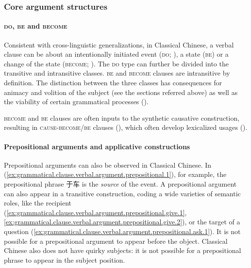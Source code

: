 \documentclass[UTF8, a4paper, oneside, scheme=plain, 12pt]{ctexrep}
\newcommand*{\term}[1]{\emph{#1}}
\newcommand*{\category}[1]{\textsc{#1}}
\begin{document}
\subsubsection{Core argument structures}

\paragraph{\category{do}, \category{be} and \category{become}}
Consistent with cross-linguistic generalizations, in Classical Chinese,
a verbal clause can be about an intentionally initiated event (\category{do}; ),
a state (\category{be}) or a change of the state (\category{become}; ).
The \category{do} type can further be divided into the transitive and intransitive classes.
\category{be} and \category{become} clauses are intransitive by definition.
The distinction between the three classes has consequences for
animacy and volition of the subject (see the sections referred above)
as well as the viability of certain grammatical processes ().

\category{become} and \category{be} clauses are often inputs to the synthetic causative construction,
resulting in \category{cause}-\category{become}/\category{be} clauses
(),
which often develop lexicalized usages ().

\paragraph{Prepositional arguments and applicative constructions}\label{sec:grammatical.verbal.argument.prepositional}
Prepositional arguments can also be observed in Classical Chinese.
In (\ref{ex:grammatical.clause.verbal.argument.prepositional.1}),
for example, the prepositional phrase 于车 is the \term{source} of the event.
A prepositional argument can also appear in a transitive construction,
coding a wide varieties of semantic roles,
like the recipient (\ref{ex:grammatical.clause.verbal.argument.prepositional.give.1}, \ref{ex:grammatical.clause.verbal.argument.prepositional.give.2}),
or the target of a question (\ref{ex:grammatical.clause.verbal.argument.prepositional.ask.1}).
It is not possible for a prepositional argument to appear before the object.
Classical Chinese also does not have quirky subjects:
it is not possible for a prepositional phrase to appear in the subject position.
\end{document}
